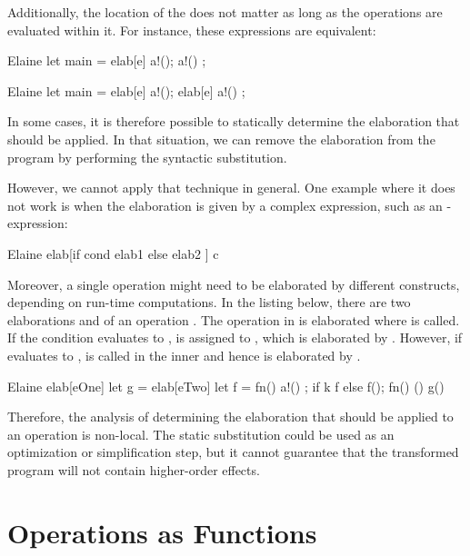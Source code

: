 Additionally, the location of the  does not matter as long as the operations are evaluated within it. For instance, these expressions are equivalent:

\begin{minipage}[b]{0.5\textwidth}
\begin{lst}{Elaine}
let main = elab[e] {
    a!();
    a!()
};
\end{lst}
\end{minipage}
\begin{minipage}[b]{0.5\textwidth}
\begin{lst}{Elaine}
let main = {
    elab[e] a!();
    elab[e] a!()
};
\end{lst}
\end{minipage}

In some cases, it is therefore possible to statically determine the elaboration that should be applied. In that situation, we can remove the elaboration from the program by performing the syntactic substitution.

However, we cannot apply that technique in general. One example where it does not work is when the elaboration is given by a complex expression, such as an -expression:
\begin{lst}{Elaine}
elab[if cond { elab1 } else { elab2 }] c
\end{lst}
%
Moreover, a single operation might need to be elaborated by different  constructs, depending on run-time computations. In the listing below, there are two elaborations  and  of an operation . The  operation in  is elaborated where  is called. If the condition  evaluates to ,  is assigned to , which is elaborated by . However, if  evaluates to ,  is called in the inner  and hence  is elaborated by .

\begin{lst}{Elaine}
elab[eOne] {
    let g = elab[eTwo] {
        let f = fn() { a!() };
        if k {
            f
        } else {
            f();
            fn() { () }
        }
    }
    g()
}
\end{lst}
%
Therefore, the analysis of determining the elaboration that should be applied to an operation is non-local. The static substitution could be used as an optimization or simplification step, but it cannot guarantee that the transformed program will not contain higher-order effects.

\section{Operations as Functions}

